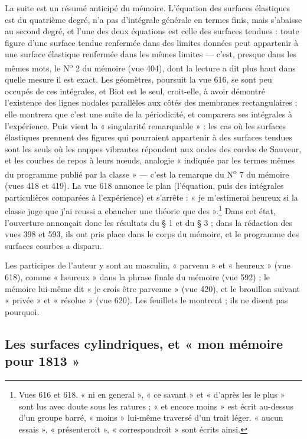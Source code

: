 \documentclass[11pt,a4paper]{article}
\begin{document}
La suite est un résumé anticipé du mémoire. L'équation des surfaces élastiques est du
quatrième degré, n'a pas d'intégrale générale en termes finis, mais s'abaisse au second
degré, et l'une des deux équations est celle des surfaces tendues : toute figure
d'une surface tendue renfermée dans des limites données peut appartenir à une surface
élastique renfermée dans les mêmes limites — c'est, presque dans les mêmes mots, le
N\textsuperscript{o} 2 du mémoire (vue 404), dont la lecture a dit plus haut dans quelle
mesure il est exact. Les géomètres, poursuit la vue 616, se sont peu occupés de ces
intégrales, et Biot est le seul, croit-elle, à avoir démontré l'existence des lignes
nodales parallèles aux côtés des membranes rectangulaires ; elle montrera que c'est une
suite de la périodicité, et comparera ses intégrales à l'expérience. Puis vient la
« singularité remarquable » : les cas où les surfaces élastiques prennent des figures
qui pourraient appartenir à des surfaces tendues sont les seuls où les nappes
vibrantes répondent aux ondes des cordes de Sauveur, et les courbes de repos à leurs
nœuds, analogie « indiquée par les termes mêmes du programme publié par la classe » —
c'est la remarque du N\textsuperscript{o} 7 du mémoire (vues 418 et 419). La vue 618
annonce le plan (l'équation, puis des intégrales particulières comparées à
l'expérience) et s'arrête : « je m'estimerai heureux si la classe juge que j'ai reussi
a ebaucher une théorie que des ».\footnote{Vues 616 et 618. « ni en general », « ce
savant » et « d'après les le plus » sont lus avec doute sous les ratures ; « et encore
moins » est écrit au-dessus d'un groupe barré, « moins » lui-même traversé d'un trait
léger. « aucun essais », « présenteroit », « correspondroit » sont écrits ainsi.} Dans
cet état, l'ouverture annonçait donc les résultats du § 1 et du § 3 ; dans la rédaction
des vues 398 et 593, ils ont pris place dans le corps du mémoire, et le programme des
surfaces courbes a disparu.

Les participes de l'auteur y sont au masculin, « parvenu » et « heureux » (vue 618),
comme « heureux » dans la phrase finale du mémoire (vue 592) ; le mémoire lui-même dit
« je crois être parvenue » (vue 420), et le brouillon suivant « privée » et « résolue »
(vue 620). Les feuillets le montrent ; ils ne disent pas pourquoi.

\subsection*{Les surfaces cylindriques, et « mon mémoire pour 1813 »}
\end{document}
